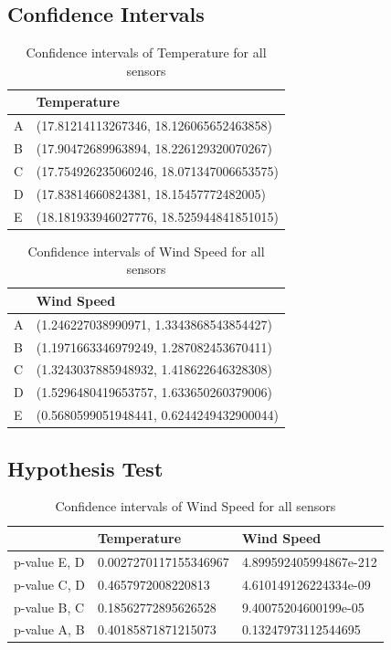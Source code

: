\documentclass{article}
\begin{document}
    \subsection{Confidence Intervals}
        \begin{table}[H]
            \caption {Confidence intervals of Temperature for all sensors}
            \begin{tabular}{ll}
            & Temperature                              \\ \hline
            A & (17.81214113267346, 18.126065652463858)  \\
            B & (17.90472689963894, 18.226129320070267)  \\
            C & (17.754926235060246, 18.071347006653575) \\
            D & (17.83814660824381, 18.15457772482005)   \\
            E & (18.181933946027776, 18.525944841851015)
            \end{tabular}
            \end{table}

        \begin{table}[H]
            \caption {Confidence intervals of Wind Speed for all sensors}
            \begin{tabular}{ll}
            & Wind Speed                               \\ \hline
            A & (1.246227038990971, 1.3343868543854427)  \\
            B & (1.1971663346979249, 1.287082453670411)  \\
            C & (1.3243037885948932, 1.418622646328308)  \\
            D & (1.5296480419653757, 1.633650260379006)  \\
            E & (0.5680599051948441, 0.6244249432900044)
            \end{tabular}
            \end{table}

    \subsection{Hypothesis Test}
        \begin{table}[H]
            \caption {Confidence intervals of Wind Speed for all sensors}
            \begin{tabular}{lll}
                        & Temperature             & Wind Speed  \\ \hline
            p-value E, D & 0.0027270117155346967 & 4.899592405994867e-212  \\ 
            p-value C, D & 0.4657972008220813 & 4.610149126224334e-09  \\
            p-value B, C & 0.18562772895626528 & 9.40075204600199e-05  \\
            p-value A, B & 0.40185871871215073 & 0.13247973112544695 
            \end{tabular}
        \end{table}

    
       
\end{document}
